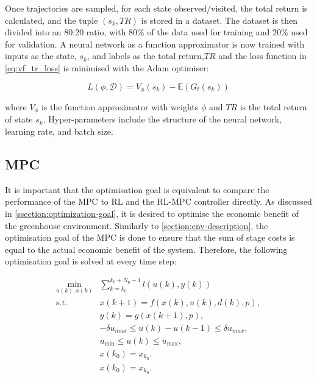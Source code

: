 Once trajectories are sampled, for each state observed/visited, the total return is calculated, and the tuple $(s_k,TR)$ is stored in a dataset. The dataset is then divided into an 80:20 ratio, with 80\% of the data used for training and 20\% used for validation. A neural network as a function approximator is now trained with inputs as the state, $s_k$, and labels as the total return,$TR$ and the loss function in \autoref{eq:vf_tr_loss} is minimised with the Adam optimiser:

\begin{equation}\label{eq:vf_tr_loss}
	L(\phi, \mathcal{D}) =   V_{\phi}(s_k) - \mathbb{E}(G_t(s_k))
\end{equation}

where $V_{\phi}$ is the function approximator with weights $\phi$ and $TR$ is the total return of state $s_k$. Hyper-parameters include the structure of the neural network, learning rate, and batch size.\\


\subsection{MPC}
It is important that the optimisation goal is equivalent to compare the performance of the MPC to RL and the RL-MPC controller directly. As discussed in \autoref{ssection:optimization-goal}, it is desired to optimise the economic benefit of the greenhouse environment. Similarly to \autoref{section:env-description}, the optimisation goal of the MPC is done to ensure that the sum of stage costs is equal to the actual economic benefit of the system. Therefore, the following optimisation goal is solved at every time step:

\begin{subequations} \label{eq:mpc_ocp}
	\begin{align}
		\min_{u(k),x(k)} & \sum_{k = k_0}^{k_0 + N_p-1} {l(u(k), y(k))} \\
		\text{s.t.} \quad & x(k+1) = f(x(k), u(k), d(k), p),  \label{eq:constraint-1} \\
		& y(k) = g(x(k+1), p), \label{eq:constraint-dynamics} \\
		& -\delta u_{max} \leq u(k) - u(k-1) \leq \delta u_{max}, \label{eq:constraint-delta-u} \\
		& u_{\min} \leq u(k) \leq u_{\max}, \label{eq:constraint-u-limits}\\
		& x(k_0) = x_{k_0}. \label{eq:constraint-initial}\\
		& x(k_0) = x_{k_0}. \label{eq:constraint-initial}
	\end{align}
\end{subequations}

